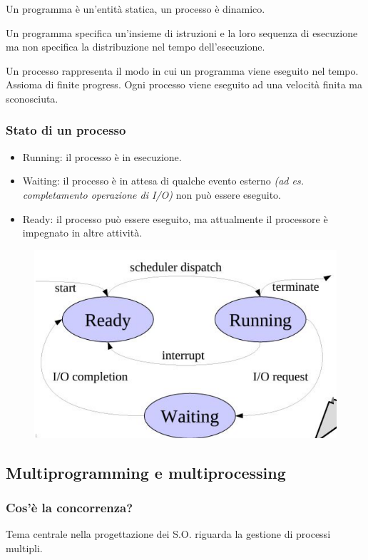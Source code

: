 Un programma è un’entità statica, un processo è dinamico.

Un programma specifica un'insieme di istruzioni e la loro sequenza di esecuzione ma non specifica la distribuzione nel tempo dell'esecuzione.

Un processo rappresenta il modo in cui un programma viene eseguito nel tempo. Assioma di finite progress. Ogni processo viene eseguito ad una velocità finita ma sconosciuta.

\subsubsection{Stato di un processo}
\begin{itemize}
    \item Running: il processo è in esecuzione.
    \item Waiting: il processo è in attesa di qualche evento esterno \textit{(ad es. completamento operazione di I/O)} non può essere eseguito.
    \item Ready: il processo può essere eseguito, ma attualmente il processore è impegnato in altre attività.
\end{itemize}

\begin{figure} [h]
    \centering
    \includegraphics[width=0.5\linewidth]{Images/Screenshot 2024-12-26 at 15-07-23 so-03.1-concorrenza - so-03.1-concorrenza.pdf.png}
\end{figure}

\subsection{Multiprogramming e multiprocessing}

\subsubsection{Cos'è la concorrenza?}

Tema centrale nella progettazione dei S.O. riguarda la gestione
di processi multipli.

